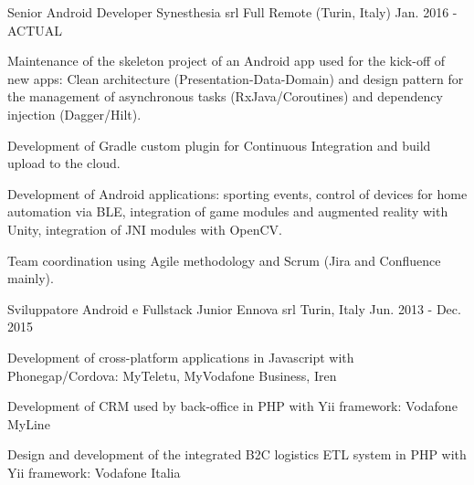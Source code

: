 


\begin{cventries}


\cventry
{Senior Android Developer} %
{Synesthesia srl} %
{Full Remote (Turin, Italy)} %
{Jan. 2016 - ACTUAL} %
{ %
	\begin{cvitems}
		\item {Maintenance of the skeleton project of an Android app used for the kick-off of new apps: Clean architecture (Presentation-Data-Domain) and design pattern for the management of asynchronous tasks (RxJava/Coroutines) and dependency injection (Dagger/Hilt).}
		\item {Development of Gradle custom plugin for Continuous Integration and build upload to the cloud.}
		\item {Development of Android applications: sporting events, control of devices for home automation via BLE, integration of game modules and augmented reality with Unity, integration of JNI modules with OpenCV.}
		\item {Team coordination using Agile methodology and Scrum (Jira and Confluence mainly). }
	\end{cvitems}
}


\cventry
{Sviluppatore Android e Fullstack Junior} %
{Ennova srl} %
{Turin, Italy} %
{Jun. 2013 - Dec. 2015} %
{ %
	\begin{cvitems}
		\item {Development of cross-platform applications in Javascript with Phonegap/Cordova: MyTeletu, MyVodafone Business, Iren}
		\item {Development of CRM used by back-office in PHP with Yii framework: Vodafone MyLine}
		\item {Design and development of the integrated B2C logistics ETL system in PHP with Yii framework: Vodafone Italia}
	\end{cvitems}
}

\end{cventries}